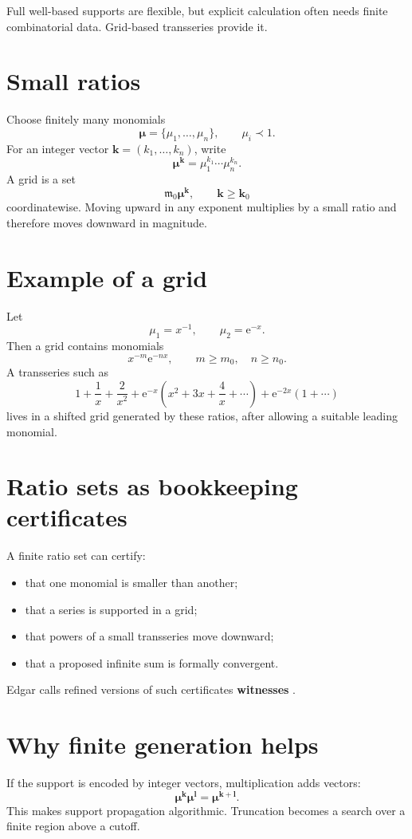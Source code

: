 \documentclass[11pt,oneside,openany]{book}
\newcommand{\e}{\mathrm{e}}
\newcommand{\mon}{\mathfrak{m}}
\theoremstyle{plain}
\theoremstyle{definition}
\theoremstyle{remark}
\newcommand{\term}[1]{\textbf{#1}}
\begin{document}
Full well-based supports are flexible, but explicit calculation often needs finite combinatorial data. Grid-based transseries provide it.

\section{Small ratios}
Choose finitely many monomials
\[
  \boldsymbol\mu=\{\mu_1,\ldots,\mu_n\},
  \qquad\mu_i\prec1.
\]
For an integer vector $\bm k=(k_1,\ldots,k_n)$, write
\[
  \boldsymbol\mu^{\bm k}
  =\mu_1^{k_1}\cdots\mu_n^{k_n}.
\]
A grid is a set
\[
  \mon_0\boldsymbol\mu^{\bm k},
  \qquad \bm k\ge\bm k_0
\]
coordinatewise. Moving upward in any exponent multiplies by a small ratio and therefore moves downward in magnitude.

\section{Example of a grid}
Let
\[
  \mu_1=x^{-1},
  \qquad\mu_2=\e^{-x}.
\]
Then a grid contains monomials
\[
  x^{-m}\e^{-nx},
  \qquad m\ge m_0,
  \quad n\ge n_0.
\]
A transseries such as
\[
  1+\frac1x+\frac2{x^2}
  +\e^{-x}\left(x^2+3x+\frac4x+\cdots\right)
  +\e^{-2x}(1+\cdots)
\]
lives in a shifted grid generated by these ratios, after allowing a suitable leading monomial.

\section{Ratio sets as bookkeeping certificates}
A finite ratio set can certify:
\begin{itemize}
  \item that one monomial is smaller than another;
  \item that a series is supported in a grid;
  \item that powers of a small transseries move downward;
  \item that a proposed infinite sum is formally convergent.
\end{itemize}
Edgar calls refined versions of such certificates \term{witnesses} \cite{EdgarRatios}.

\section{Why finite generation helps}
If the support is encoded by integer vectors, multiplication adds vectors:
\[
  \boldsymbol\mu^{\bm k}
  \boldsymbol\mu^{\bm l}
  =\boldsymbol\mu^{\bm k+\bm l}.
\]
This makes support propagation algorithmic. Truncation becomes a search over a finite region above a cutoff.
\end{document}
